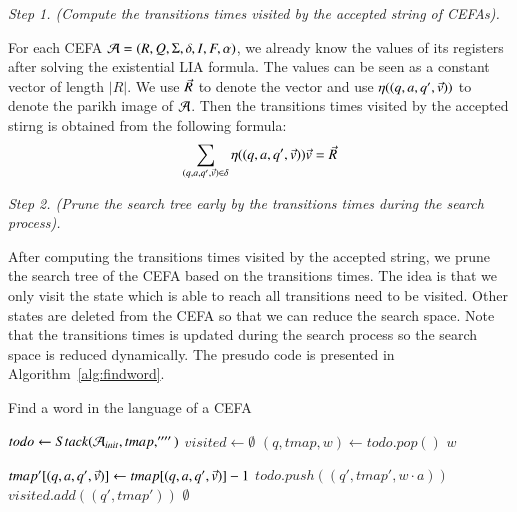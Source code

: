 \medskip
\noindent
\emph{Step 1. (Compute the transitions times visited by the accepted string of CEFAs).}

For each CEFA $\mathcal{A} = (R, Q, \Sigma, \delta, I, F, \alpha)$, we already know the values of its registers after solving the existential LIA formula. The values can be seen as a constant vector of length $|R|$. We use $\vec{R}$ to denote the vector and use $\eta((q, a, q', \vec{v}))$ to denote the parikh image of $\mathcal{A}$. Then the transitions times visited by the accepted stirng is obtained from the following formula:
$$ \sum \limits_{(q, a, q', \vec{v})\in \delta} \eta((q, a, q', \vec{v}))\vec{v} = \vec{R}$$

\medskip
\noindent
\emph{Step 2. (Prune the search tree early by the transitions times during the search process).}

After computing the transitions times visited by the accepted string, we prune the search tree of the CEFA based on the transitions times. The idea is that we only visit the state which is able to reach all transitions need to be visited. Other states are deleted from the CEFA so that we can reduce the search space.
Note that the transitions times is updated during the search process so the search space is reduced dynamically. The presudo code is presented in Algorithm~\ref{alg:findword}.

\begin{algorithm}[H]
  \caption{Find a word in the language of a CEFA}\label{alg:findword}
  \begin{algorithmic}[1]
      \State $todo \gets Stack(\mathcal{A}_{init}, tmap, '''')$
      \State $visited \gets \emptyset$
        \State $(q, tmap, w) \gets todo.pop()$
          \State \Return $w$
        \EndIf
        
          \State $tmap'[(q, a, q', \vec{v})] \gets tmap[(q, a, q', \vec{v})] - 1$
            \State $todo.push((q', tmap', w\cdot a))$
            \State $visited.add((q', tmap'))$
          \EndIf
        \EndFor
      \EndWhile
      \State \Return $\emptyset$ 
  \EndProcedure
  \end{algorithmic}
  \end{algorithm}

